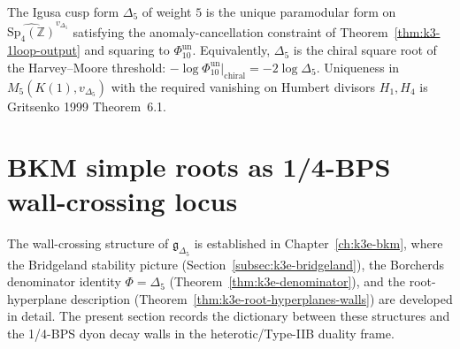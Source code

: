 \begin{corollary}
\label{cor:delta5-1loop-output}
The Igusa cusp form $\Delta_5$ of weight $5$ is the unique paramodular form
on $\widehat{\mathrm{Sp}_4(\mathbb{Z})}^{v_{\Delta_5}}$ satisfying the
anomaly-cancellation constraint of Theorem~\ref{thm:k3-1loop-output} and
squaring to \(\Phi_{10}^{\mathrm{un}}\). Equivalently, $\Delta_5$ is the chiral square root
of the Harvey--Moore threshold:
$-\log\Phi_{10}^{\mathrm{un}}\bigr|_{\mathrm{chiral}} = -2\log\Delta_5$. Uniqueness in
$M_5(K(1), v_{\Delta_5})$ with the required vanishing on Humbert divisors
$H_1, H_4$ is Gritsenko 1999 Theorem~6.1.
\end{corollary}

\section{BKM simple roots as 1/4-BPS wall-crossing locus}
\label{sec:bkm-simple-roots-wall-crossing}

The wall-crossing structure of $\mathfrak{g}_{\Delta_5}$ is established in
Chapter~\ref{ch:k3e-bkm}, where the Bridgeland stability picture
(Section~\ref{subsec:k3e-bridgeland}), the Borcherds denominator identity
$\Phi = \Delta_5$ (Theorem~\ref{thm:k3e-denominator}), and the root-hyperplane
description (Theorem~\ref{thm:k3e-root-hyperplanes-walls}) are developed in
detail. The present section records the dictionary between these structures
and the 1/4-BPS dyon decay walls in the heterotic/Type-IIB duality frame.

